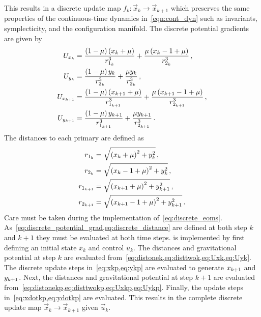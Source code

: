 \documentclass[preprint]{elsarticle}
\begin{document}
This results in a discrete update map \( f_k: \vec{x}_k \to \vec{x}_{k+1} \) which preserves the same properties of the continuous-time dynamics in~\cref{eqn:cont_dyn} such as invariants, symplecticity, and the configuration manifold.
The discrete potential gradients are given by
\begin{subequations}\label{eq:discrete_potential_grad}
\begin{align}
	U_{x_k} &= \frac{\left( 1 -\mu \right) \left( x_k + \mu \right)}{r_{1_k}^3} + \frac{ \mu \left( x_k -1 + \mu \right)}{r_{2_{k}}^3} \label{eq:Uxk} \, ,\\
	U_{y_{k}} &= \frac{\left( 1 -\mu \right) y_{k}}{r_{2_{k}}^3} + \frac{ \mu y_{k}}{r_{2_{k}}^3} \label{eq:Uyk} \, ,\\
	U_{x_{k+1}} &= \frac{\left( 1 -\mu \right) \left( x_{k+1} + \mu \right)}{r_{1_{k+1}}^3} + \frac{ \mu \left( x_{k+1} -1 + \mu \right)}{r_{2_{k+1}}^3} \label{eq:Uxkp}\, ,\\
	U_{y_{k+1}} &= \frac{\left( 1 -\mu \right) y_{k+1}}{r_{1_{k+1}}^3} + \frac{ \mu y_{k+1}}{r_{2_{k+1}}^3} \label{eq:Uykp} \, .
\end{align}	
\end{subequations}
The distances to each primary are defined as
\begin{subequations}\label{eq:discrete_distance}
\begin{align}
	r_{1_k} &= \sqrt{\left( x_k + \mu\right)^2 + y_{k}^2} \label{eq:distonek}\, ,\\
	r_{2_{k}} &= \sqrt{\left( x_k - 1 + \mu\right)^2 + y_{k}^2} \label{eq:disttwok}\, ,\\
	r_{1_{k+1}} &= \sqrt{\left( x_{k+1} + \mu\right)^2 + y_{k+1}^2} \label{eq:distonekp}\, ,\\
	r_{2_{k+1}} &= \sqrt{\left( x_{k+1} - 1 + \mu\right)^2 + y_{k+1}^2} \label{eq:disttwokp} \, .
\end{align}
\end{subequations}
Care must be taken during the implementation of~\cref{eq:discrete_eoms}.
As~\cref{eq:discrete_potential_grad,eq:discrete_distance} are defined at both step \( k \) and \( k+1 \) they must be evaluated at both time steps.
 is implemented by first defining an initial state \( \bar{x}_k \) and control \( \bar{u}_k \).
The distances and gravitational potential at step \( k \) are evaluated from~\cref{eq:distonek,eq:disttwok,eq:Uxk,eq:Uyk}.
The discrete update steps in~\cref{eq:xkp,eq:ykp} are evaluated to generate \( x_{k+1} \) and \( y_{k+1}\).
Next, the distances and gravitational potential at step \( k+1 \) are evaluated from~\cref{eq:distonekp,eq:disttwokp,eq:Uxkp,eq:Uykp}. 
Finally, the update steps in~\cref{eq:xdotkp,eq:ydotkp} are evaluated.
This results in the complete discrete update map \( \vec{x}_k \to \vec{x}_{k+1} \) given \( \vec{u}_k \).
\end{document}
